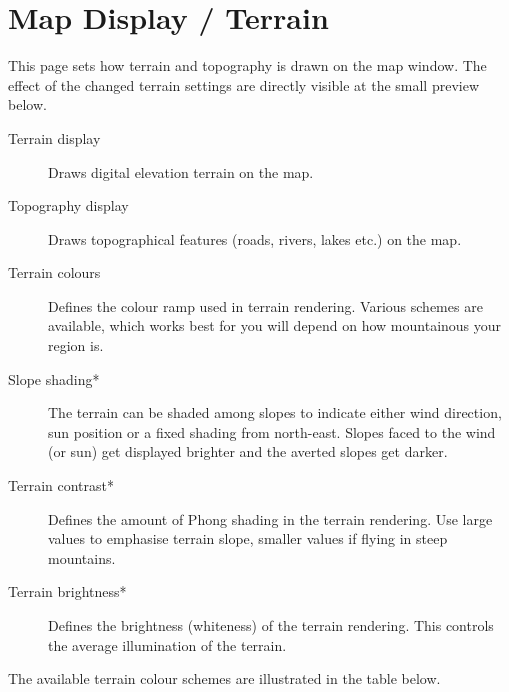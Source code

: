\section{Map Display / Terrain}\label{sec:terrain-display}

This page sets how terrain and topography is drawn on the map window. The effect of the 
changed terrain settings are directly visible at the small preview below.

\begin{description}
\item[Terrain display]  Draws digital elevation terrain on the map.
\item[Topography display]  Draws topographical features (roads, rivers, lakes etc.) on
  the map.
\item[Terrain colours]  Defines the colour ramp used in terrain rendering.  Various 
  schemes are available, which works best for you will depend on how mountainous your region is.
\item[Slope shading*]  \label{conf:shading} The terrain can be shaded among slopes 
  to indicate either wind direction, sun position or a fixed shading from north-east. 
  Slopes faced to the wind (or sun) get displayed brighter and the averted slopes get darker.
\item[Terrain contrast*]  Defines the amount of Phong shading in the terrain rendering. 
  Use large values to emphasise terrain slope, smaller values if flying in steep mountains.
\item[Terrain brightness*]  Defines the brightness (whiteness) of the terrain rendering. 
  This controls the average illumination of the terrain.
\end{description}


The available terrain colour schemes are illustrated in the table below.

